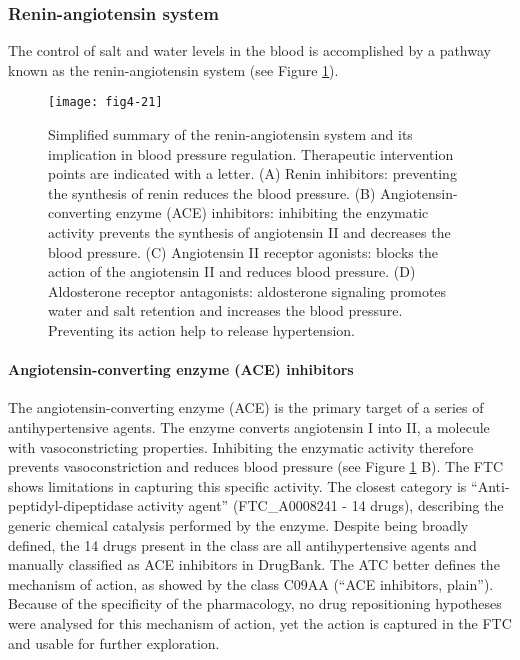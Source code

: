 \subsubsection{Renin-angiotensin system}
The control of salt and water levels in the blood is accomplished by a pathway known as the renin-angiotensin system (see Figure \ref{fig4-21}).

\begin{figure}[H]
    \centering
    \texttt{[image: fig4-21]}
    \caption{Simplified summary of the renin-angiotensin system and its implication in blood pressure regulation. Therapeutic intervention points are indicated with a letter. (A) Renin inhibitors: preventing the synthesis of renin reduces the blood pressure. (B) Angiotensin-converting enzyme (ACE) inhibitors: inhibiting the enzymatic activity prevents the synthesis of angiotensin II and decreases the blood pressure. (C) Angiotensin II receptor agonists: blocks the action of the angiotensin II and reduces blood pressure. (D) Aldosterone receptor antagonists: aldosterone signaling promotes water and salt retention and increases the blood pressure. Preventing its action help to release hypertension.}
    \label{fig4-21}
\end{figure}

\paragraph{\textbf{Angiotensin-converting enzyme (ACE) inhibitors}\\}
The angiotensin-converting enzyme (ACE) is the primary target of a series of antihypertensive agents. The enzyme converts angiotensin I into II, a molecule with vasoconstricting properties. Inhibiting the enzymatic activity therefore prevents vasoconstriction and reduces blood pressure (see Figure \ref{fig4-21} B).
The FTC shows limitations in capturing this specific activity. The closest category is “Anti-peptidyl-dipeptidase activity agent” (FTC\_A0008241 - 14 drugs), describing the generic chemical catalysis performed by the enzyme. Despite being broadly defined, the 14 drugs present in the class are all antihypertensive agents and manually classified as ACE inhibitors in DrugBank. The ATC better defines the mechanism of action, as showed by the class C09AA (“ACE inhibitors, plain”). Because of the specificity of the pharmacology, no drug repositioning hypotheses were analysed for this mechanism of action, yet the action is captured in the FTC and usable for further exploration.

